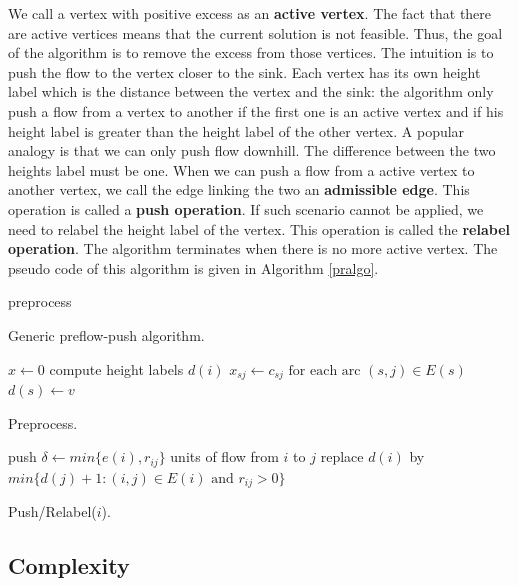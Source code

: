We call a vertex with positive excess as an \textbf{active vertex}. The fact that there are active vertices means that the current solution is not feasible. Thus, the goal of the algorithm is to remove the excess from those vertices. The intuition is to push the flow to the vertex closer to the sink. Each vertex has its own height label which is the distance between the vertex and the sink: the algorithm only push a flow from a vertex to another if the first one is an active vertex and if his height label is greater than the height label of the other vertex. A popular analogy is that we can only push flow downhill. The difference between the two heights label must be one. When we can push a flow from a active vertex to another vertex, we call the edge linking the two an \textbf{admissible edge}. This operation is called a \textbf{push operation}. If such scenario cannot be applied, we need to relabel the height label of the vertex. This operation is called the \textbf{relabel operation}. The algorithm terminates when there is no more active vertex. The pseudo code of this algorithm is given in  Algorithm \ref{pralgo}.


\begin{algorithm}
 preprocess\;
\caption{Generic preflow-push algorithm.}
\label{pralgo}
\end{algorithm}

\begin{algorithm}
 $x\gets 0$\;
 compute height labels $d(i)$\;
 $x_{sj}\gets c_{sj} \text{ for each arc } (s, j) \in E(s)$\;
 $d(s)\gets v$\;
\caption{Preprocess.}
\end{algorithm}

\begin{algorithm}
  {push $\delta\gets min\{e(i), r_{ij}\}$ units of flow from $i$ to $j$\;}
\Else
   {replace $d(i)$ by $min\{d(j)+1 : (i, j) \in E(i) \text{ and } r_{ij} > 0 \}$\;}
\caption{Push/Relabel($i$).}
\end{algorithm}

\subsection{Complexity}

